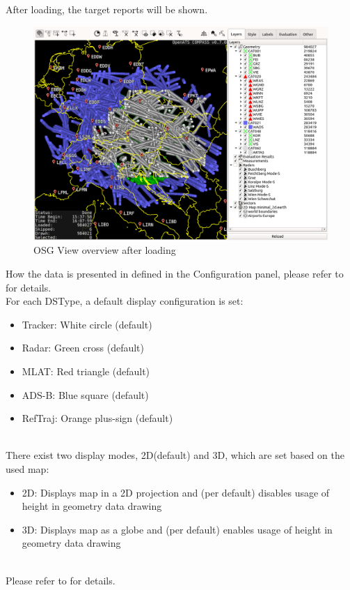 After loading, the target reports will be shown.

\begin{figure}[H]
    \hspace*{-2.5cm}
    \includegraphics[width=19cm,frame]{figures/osgview_overview_loaded.png}
  \caption{OSG View overview after loading}
\end{figure} 

How the data is presented in defined in the Configuration panel, please refer to  for details. \\

For each DSType, a default display configuration is set:

\begin{itemize}
 \item Tracker: White circle (default)
 \item Radar: Green cross (default)
 \item MLAT: Red triangle (default)
 \item ADS-B: Blue square (default)
 \item RefTraj: Orange plus-sign (default)
\end{itemize}
\ \\

There exist two display modes, 2D(default) and 3D, which are set based on the used map:

\begin{itemize}
 \item 2D: Displays map in a 2D projection and (per default) disables usage of height in geometry data drawing
 \item 3D: Displays map as a globe and (per default) enables usage of height in geometry data drawing
\end{itemize}
\ \\
Please refer to  for details.
